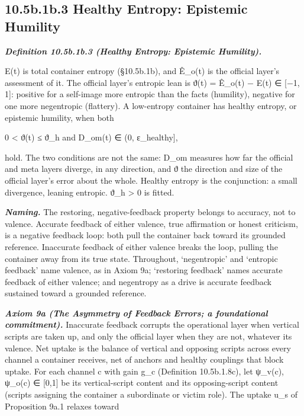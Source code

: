 \documentclass[
]{article}
\begin{document}
\hypertarget{b.1b.3-healthy-entropy-epistemic-humility}{%
\subsection{10.5b.1b.3 Healthy Entropy: Epistemic
Humility}\label{b.1b.3-healthy-entropy-epistemic-humility}}

\emph{\textbf{Definition 10.5b.1b.3 (Healthy Entropy: Epistemic
Humility).}}

E(t) is total container entropy (§10.5b.1b), and Ê\_o(t) is the official
layer's assessment of it. The official layer's entropic lean is ϑ(t) =
Ê\_o(t) − E(t) ∈ {[}−1, 1{]}: positive for a self-image more entropic
than the facts (humility), negative for one more negentropic (flattery).
A low-entropy container has healthy entropy, or epistemic humility, when
both

0 \textless{} ϑ(t) ≤ ϑ\_h and D\_om(t) ∈ (0, ε\_healthy{]},

hold. The two conditions are not the same: D\_om measures how far the
official and meta layers diverge, in any direction, and ϑ the direction
and size of the official layer's error about the whole. Healthy entropy
is the conjunction: a small divergence, leaning entropic. ϑ\_h
\textgreater{} 0 is fitted.

\emph{\textbf{Naming.}} The restoring, negative-feedback property
belongs to accuracy, not to valence. Accurate feedback of either
valence, true affirmation or honest criticism, is a negative feedback
loop: both pull the container back toward its grounded reference.
Inaccurate feedback of either valence breaks the loop, pulling the
container away from its true state. Throughout, `negentropic' and
`entropic feedback' name valence, as in Axiom 9a; `restoring feedback'
names accurate feedback of either valence; and negentropy as a drive is
accurate feedback sustained toward a grounded reference.

\emph{\textbf{Axiom 9a (The Asymmetry of Feedback Errors; a foundational
commitment).}} Inaccurate feedback corrupts the operational layer when
vertical scripts are taken up, and only the official layer when they are
not, whatever its valence. Net uptake is the balance of vertical and
opposing scripts across every channel a container receives, net of
anchors and healthy couplings that block uptake. For each channel c with
gain g\_c (Definition 10.5b.1.8c), let ψ\_v(c), ψ\_o(c) ∈ {[}0,1{]} be
its vertical-script content and its opposing-script content (scripts
assigning the container a subordinate or victim role). The uptake u\_s
of Proposition 9a.1 relaxes toward
\end{document}
